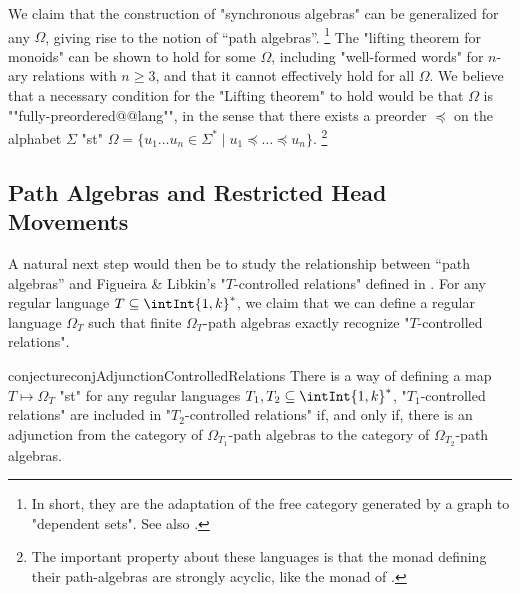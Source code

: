 We claim that the construction of "synchronous algebras"
can be generalized for any $\Omega$, giving rise to the notion of ``path algebras''.%
\footnote{In short, they are the adaptation of
the free category generated by a graph to "dependent sets". See also .}
The "lifting theorem for monoids" can be shown to hold for some $\Omega$, including "well-formed words" for $n$-ary relations with $n\geq 3$, and that it cannot effectively hold for all $\Omega$.
We believe that a necessary condition for the "Lifting theorem" to hold
would be that $\Omega$ is ""fully-preordered@@lang"",
in the sense that there exists a preorder $\preccurlyeq$ on the alphabet $\Sigma$
"st" $\Omega = \{u_1 \dotsc u_n \in \Sigma^* \mid u_1 \preccurlyeq \dotsc \preccurlyeq u_n\}$.%
\footnote{The important property about these languages is that
the monad defining their path-algebras are strongly acyclic, like the
monad of .}

\subsection{Path Algebras and Restricted Head Movements}

A natural next step would then be to study the relationship between ``path algebras'' and
Figueira \& Libkin's "$T$-controlled relations" defined
in .
For any regular language $T \subseteq \intInt{1,k}^*$, we claim that we can define a regular language $\Omega_T$ such that finite $\Omega_T$-path algebras exactly recognize 
"$T$-controlled relations".

\begin{restatable}{conjecture}{conjAdjunctionControlledRelations}
	\AP\label{conj:controlled-relations-category-equivalence}
	There is a way of defining a map $T \mapsto \Omega_T$ "st"
	for any regular languages $T_1, T_2 \subseteq \intInt{1,k}^*$,
	"$T_1$-controlled relations" are included in "$T_2$-controlled relations" if, and only if,
	there is an adjunction from the category of $\Omega_{T_1}$-path algebras to the category of
	$\Omega_{T_2}$-path algebras.
\end{restatable}


